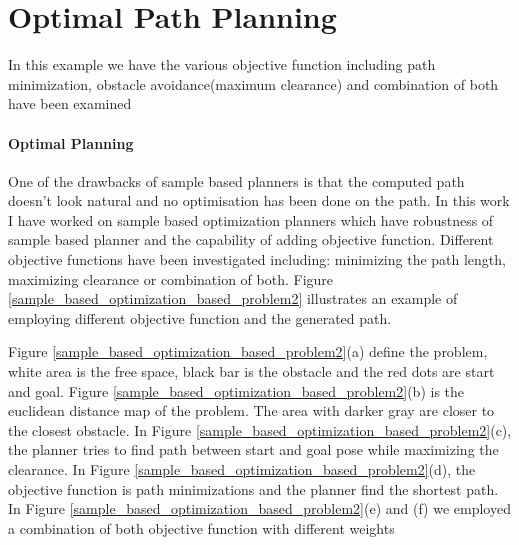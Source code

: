 \documentclass[letterpaper, 9pt, conference]{ieeeconf}  %
\begin{document}
\section{Optimal Path Planning}\label{Optimal_Path_Planning}
In this example we have the various objective function including path minimization, obstacle avoidance(maximum clearance)
and combination of both have been examined









\paragraph{Optimal Planning}
One of the drawbacks of sample based planners is that the computed path doesn't look natural and no optimisation has been done on the path. In this work I have 
worked on sample based optimization planners which have robustness of sample based planner and the capability of adding objective function.
Different objective functions have been investigated including: minimizing the path length, maximizing clearance or combination of both.
Figure \ref{sample_based_optimization_based_problem2} illustrates an example of employing different objective function and the generated path.

Figure \ref{sample_based_optimization_based_problem2}(a) define the problem, white area is the free space, black bar is the obstacle and the red dots are start and goal. Figure \ref{sample_based_optimization_based_problem2}(b) is the euclidean distance map of the problem. The area with darker gray are closer to the closest obstacle. In Figure \ref{sample_based_optimization_based_problem2}(c), the planner tries to find path between start and goal pose while maximizing the clearance.
In Figure \ref{sample_based_optimization_based_problem2}(d), the objective function is path minimizations and the planner find the shortest path. In Figure \ref{sample_based_optimization_based_problem2}(e) and (f) we employed a combination of both  objective function with different weights 
\end{document}
